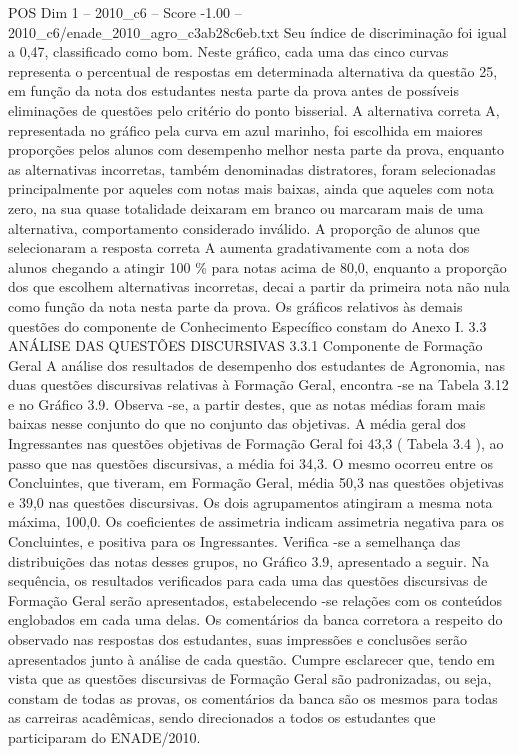 \begin{textsample}{POS Dim 1 – 2010\_c6 – Score -1.00 – 2010\_c6/enade\_2010\_agro\_c3ab28c6eb.txt}
Seu índice de discriminação foi igual a 0,47, classificado como bom.
Neste gráfico, cada uma das cinco curvas representa o percentual de respostas em determinada alternativa da questão 25, em função da nota dos estudantes nesta parte da prova antes de possíveis eliminações de questões pelo critério do ponto bisserial.
A alternativa correta A, representada no gráfico pela curva em azul marinho, foi escolhida em maiores proporções pelos alunos com desempenho melhor nesta parte da prova, enquanto as alternativas incorretas, também denominadas distratores, foram selecionadas principalmente por aqueles com notas mais baixas, ainda que aqueles com nota zero, na sua quase totalidade deixaram em branco ou marcaram mais de uma alternativa, comportamento considerado inválido.
A proporção de alunos que selecionaram a resposta correta A aumenta gradativamente com a nota dos alunos chegando a atingir 100 \% para notas acima de 80,0, enquanto a proporção dos que escolhem alternativas incorretas, decai a partir da primeira nota não nula como função da nota nesta parte da prova.
Os gráficos relativos às demais questões do componente de Conhecimento Específico constam do Anexo I. 3.3 ANÁLISE DAS QUESTÕES DISCURSIVAS 3.3.1 Componente de Formação Geral A análise dos resultados de desempenho dos estudantes de Agronomia, nas duas questões discursivas relativas à Formação Geral, encontra -se na Tabela 3.12 e no Gráfico 3.9.
Observa -se, a partir destes, que as notas médias foram mais baixas nesse conjunto do que no conjunto das objetivas.
A média geral dos Ingressantes nas questões objetivas de Formação Geral foi 43,3 ( Tabela 3.4 ), ao passo que nas questões discursivas, a média foi 34,3.
O mesmo ocorreu entre os Concluintes, que tiveram, em Formação Geral, média 50,3 nas questões objetivas e 39,0 nas questões discursivas.
Os dois agrupamentos atingiram a mesma nota máxima, 100,0.
Os coeficientes de assimetria indicam assimetria negativa para os Concluintes, e positiva para os Ingressantes.
Verifica -se a semelhança das distribuições das notas desses grupos, no Gráfico 3.9, apresentado a seguir.
Na sequência, os resultados verificados para cada uma das questões discursivas de Formação Geral serão apresentados, estabelecendo -se relações com os conteúdos englobados em cada uma delas.
Os comentários da banca corretora a respeito do observado nas respostas dos estudantes, suas impressões e conclusões serão apresentados junto à análise de cada questão.
Cumpre esclarecer que, tendo em vista que as questões discursivas de Formação Geral são padronizadas, ou seja, constam de todas as provas, os comentários da banca são os mesmos para todas as carreiras acadêmicas, sendo direcionados a todos os estudantes que participaram do ENADE/2010.

\end{textsample}
